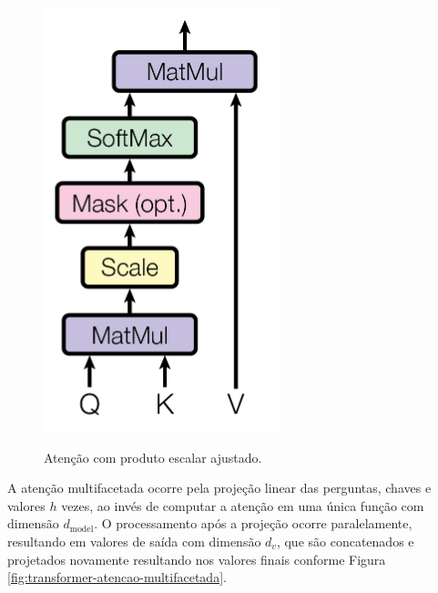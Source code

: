 \begin{figure}[htbp]
    \centering
        \caption{Atenção com produto escalar ajustado.}
        \includegraphics[scale=0.85]{resources/images/pln/transformer-scaled-dot-product-attention.png}
        \label{fig:transformer-atencao-produto-escalar-ajustado}
\end{figure}

A atenção multifacetada ocorre pela projeção linear das perguntas, chaves e valores $h$ vezes, ao invés de computar a atenção em uma única função com dimensão $d_{\text{model}}$. O processamento após a projeção ocorre paralelamente, resultando em valores de saída com dimensão $d_v$, que são concatenados e projetados novamente resultando nos valores finais conforme Figura \ref{fig:transformer-atencao-multifacetada}.

